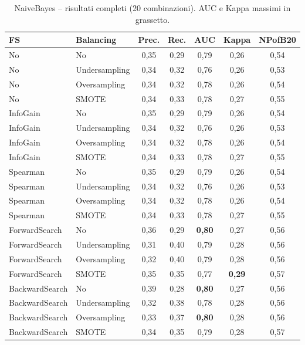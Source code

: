 \begin{table}[h!]
\centering
\small
\begin{tabular}{@{}llccccc@{}}
\toprule
\textbf{FS} & \textbf{Balancing} & \textbf{Prec.} & \textbf{Rec.} &
\textbf{AUC} & \textbf{Kappa} & \textbf{NPofB20} \\
\midrule
No             & No            & 0,35 & 0,29 & 0,79 & 0,26 & 0,54 \\
No             & Undersampling & 0,34 & 0,32 & 0,76 & 0,26 & 0,53 \\
No             & Oversampling  & 0,34 & 0,32 & 0,78 & 0,26 & 0,54 \\
No             & SMOTE         & 0,34 & 0,33 & 0,78 & 0,27 & 0,55 \\
InfoGain       & No            & 0,35 & 0,29 & 0,79 & 0,26 & 0,54 \\
InfoGain       & Undersampling & 0,34 & 0,32 & 0,76 & 0,26 & 0,53 \\
InfoGain       & Oversampling  & 0,34 & 0,32 & 0,78 & 0,26 & 0,54 \\
InfoGain       & SMOTE         & 0,34 & 0,33 & 0,78 & 0,27 & 0,55 \\
Spearman       & No            & 0,35 & 0,29 & 0,79 & 0,26 & 0,54 \\
Spearman       & Undersampling & 0,34 & 0,32 & 0,76 & 0,26 & 0,53 \\
Spearman       & Oversampling  & 0,34 & 0,32 & 0,78 & 0,26 & 0,54 \\
Spearman       & SMOTE         & 0,34 & 0,33 & 0,78 & 0,27 & 0,55 \\
ForwardSearch  & No            & 0,36 & 0,29 & \textbf{0,80} & 0,27 & 0,56 \\
ForwardSearch  & Undersampling & 0,31 & 0,40 & 0,79 & 0,28 & 0,56 \\
ForwardSearch  & Oversampling  & 0,32 & 0,40 & 0,79 & 0,28 & 0,56 \\
ForwardSearch  & SMOTE         & 0,35 & 0,35 & 0,77 & \textbf{0,29} & 0,57 \\
BackwardSearch & No            & 0,39 & 0,28 & \textbf{0,80} & 0,27 & 0,56 \\
BackwardSearch & Undersampling & 0,32 & 0,38 & 0,78 & 0,28 & 0,56 \\
BackwardSearch & Oversampling  & 0,33 & 0,37 & \textbf{0,80} & 0,28 & 0,56 \\
BackwardSearch & SMOTE         & 0,34 & 0,35 & 0,79 & 0,28 & 0,57 \\
\bottomrule
\end{tabular}
\caption{NaiveBayes -- risultati completi (20 combinazioni). AUC e Kappa massimi in grassetto.}
\label{tab:r2-nb-full}
\end{table}

